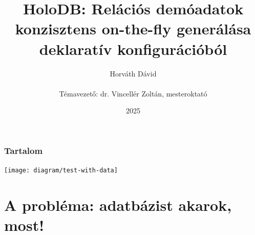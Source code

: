 \documentclass[
    aspectratio=169,
]{beamer}
\title[HoloDB]{HoloDB: Relációs demóadatok konzisztens on-the-fly generálása\\ deklaratív konfigurációból}
\author[Horváth Dávid]{Horváth Dávid \\ ~ \\ { \footnotesize Témavezető: dr. Vincellér Zoltán, mesteroktató }}
\institute[ELTE-IK]{ELTE Informatikai Kar, Információs Rendszerek Tanszék}
\date{2025}
\begin{document}
\beamertemplatenavigationsymbolsempty

\begin{frame}
    \titlepage
\end{frame}

\begin{frame}
    \frametitle{Tartalom}
    
    \hspace*{\fill}%
    \begin{minipage}[c]{0.55\textwidth}
        \parbox[t]{.95\textwidth}{
            \begin{minipage}[c][0.6\textheight]{\textwidth}
            \tableofcontents
            \end{minipage}
        }
    \end{minipage}%
    \hspace*{\fill}%
    \begin{minipage}[c]{0.38\textwidth}
        \texttt{[image: diagram/test-with-data]}
    \end{minipage}%
    \hspace*{\fill}%
\end{frame}

\section{A probléma: adatbázist akarok, most!}
\def\sectionshorttitle{\arabic{section}. A probléma}
\end{document}
